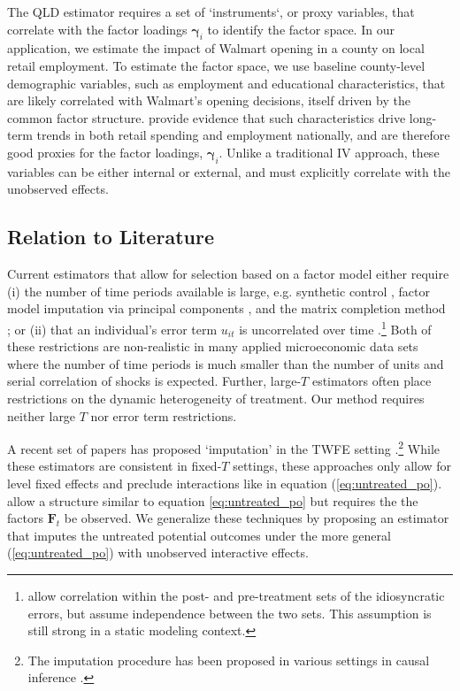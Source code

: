 \documentclass[12pt]{article}
\begin{document}
The QLD estimator requires a set of `instruments`, or proxy variables, that correlate with the factor loadings $\bm \gamma_i$ to identify the factor space. 
In our application, we estimate the impact of Walmart opening in a county on local retail employment.
To estimate the factor space, we use baseline county-level demographic variables, such as employment and educational characteristics, that are likely correlated with Walmart's opening decisions, itself driven by the common factor structure. 
\citet{hatch2000job} provide evidence that such characteristics drive long-term trends in both retail spending and employment nationally, and are therefore good proxies for the factor loadings, $\bm \gamma_i$.
Unlike a traditional IV approach, these variables can be either internal or external, and must explicitly correlate with the unobserved effects. 

\subsection*{Relation to Literature}

Current estimators that allow for selection based on a factor model either require (i) the number of time periods available is large, e.g. synthetic control \citep{abadie2021using}, factor model imputation via principal components \citep{Gobillon_Magnac_2016,xu2017generalized,Bai_Ng_2021}, and the matrix completion method  \citep{Athey_et_al_2021,fernandez2021low}; or (ii) that an individual's error term $u_{it}$ is uncorrelated over time \citep{Feng_2020,Imbens_Kallus_Mao_2021}.\footnote{\citet{Imbens_Kallus_Mao_2021} allow correlation within the post- and pre-treatment sets of the idiosyncratic errors, but assume independence between the two sets. This assumption is still strong in a static modeling context.} Both of these restrictions are non-realistic in many applied microeconomic data sets where the number of time periods is much smaller than the number of units and serial correlation of shocks is expected. Further, large-$T$ estimators often place restrictions on the dynamic heterogeneity of treatment. Our method requires neither large $T$ nor error term restrictions.

A recent set of papers has proposed `imputation' in the TWFE setting \citep{Borusyak_Jaravel_Spiess_2021,Gardner_2021,Wooldridge_2021}.\footnote{The imputation procedure has been proposed in various settings in causal inference \citep{imbens2015causal}.}
While these estimators are consistent in fixed-$T$ settings, these approaches only allow for level fixed effects and preclude interactions like in equation (\ref{eq:untreated_po}). \citet{Borusyak_Jaravel_Spiess_2021} allow a structure similar to equation \eqref{eq:untreated_po} but requires the the factors $\bm{F}_t$ be observed. We generalize these techniques by proposing an estimator that imputes the untreated potential outcomes under the more general (\ref{eq:untreated_po}) with unobserved interactive effects.
\end{document}
